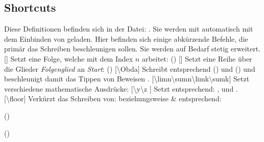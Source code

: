 \subsection[Shortcuts \LILLYxBOXxVersion{\small 1.0.8}]{Shortcuts}
Diese Definitionen befinden sich in der Datei: . Sie werden mit  automatisch mit dem Einbinden von  geladen.\medskip\newline
Hier befinden sich einige abkürzende Befehle, die primär das Schreiben beschleunigen sollen. Sie werden auf Bedarf stetig erweitert.\medskip\newline
%
%
%
[]
Setzt eine Folge, welche mit dem Index $n$ arbeitet:  (\folge)\medskip\newline
%
%
%
[]
Setzt eine Reihe über die Glieder \emph{Folgenglied} an \emph{Start}:  (\reihe)\medskip\newline
%
%
%
[\cmdlist \textbackslash Obda]
Schreibt entsprechend  () und  () und beschleunigt damit das Tippen von Beweisen \Smiley.\medskip\newline
%
%
%
[\cmdlist \textbackslash limn\cmdlist \textbackslash sumn\cmdlist \textbackslash limk\cmdlist \textbackslash sumk]
Setzt verschiedene mathematische Ausdrücke:
%
%
%
[\cmdlist \textbackslash y\cmdlist \textbackslash z \cmdold]
Setzt entsprechend: \x[], \y und \z[].\medskip\newline
%
%
%
[\cmdlist \textbackslash floor]
Verkürzt das Schreiben von:  beziehungsweise  \&  entsprechend:
\begin{multicols}{2}%
    \begin{ditemize}
        \item {} ()%
        \item {} ()%
    \end{ditemize}
\end{multicols}


